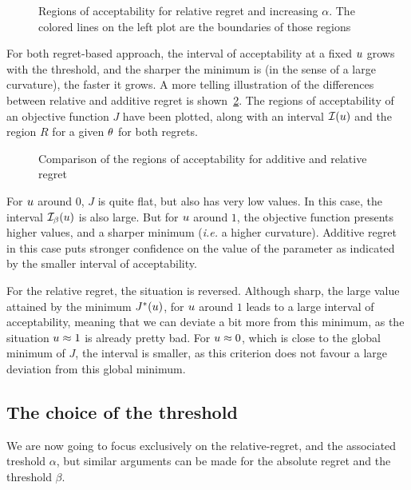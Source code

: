 \documentclass[../../Main_ManuscritThese.tex]{subfiles}
\newcommand\imgpath{/home/victor/acadwriting/Manuscrit/Text/Chapter3/img/}
\begin{document}
\begin{figure}[ht]
  \centering
  
  \caption[Regions of $\alpha$-acceptability]{\label{fig:gamma_alpha_increasing} Regions of acceptability for relative regret and increasing $\alpha$. The colored lines on the left plot are the boundaries of those regions}
\end{figure}

For both regret-based approach, the interval of acceptability at a fixed $u$ grows with the threshold, and the sharper the minimum is (in the sense of a large curvature), the faster it grows.
A more telling illustration of the differences between relative and additive regret is shown~\cref{fig:illustration_region_regret}.
The regions of acceptability of an objective function $J$ have been plotted, along with an interval $\mathcal{I}(u)$ and the region $R$ for a given $\theta$ for both regrets.
\begin{figure}[ht]
  \centering
  
  \caption{\label{fig:illustration_region_regret} Comparison of the regions of acceptability for additive and relative regret}
\end{figure}
For $u$ around $0$, $J$ is quite flat, but also has very low values. In this case, the interval $\mathcal{I}_{\beta}(u)$ is also large. But for $u$ around $1$, the objective function presents higher values, and a sharper minimum (\emph{i.e.} a higher curvature). Additive regret in this case puts stronger confidence on the value of the parameter as indicated by the smaller interval of acceptability.

For the relative regret, the situation is reversed. Although sharp, the large value attained by the minimum $J^*(u)$, for $u$ around $1$ leads to a large interval of acceptability, meaning that we can deviate a bit more from this minimum, as the situation $u \approx 1$ is already pretty bad. For $u \approx 0$, which is close to the global minimum of $J$, the interval is smaller, as this criterion does not favour a large deviation from this global minimum.



\subsection{The choice of the threshold}
\label{sec:choice_threshold}
We are now going to focus exclusively on the relative-regret, and the associated treshold $\alpha$, but similar arguments can be made for the absolute regret and the threshold $\beta$.
\end{document}
